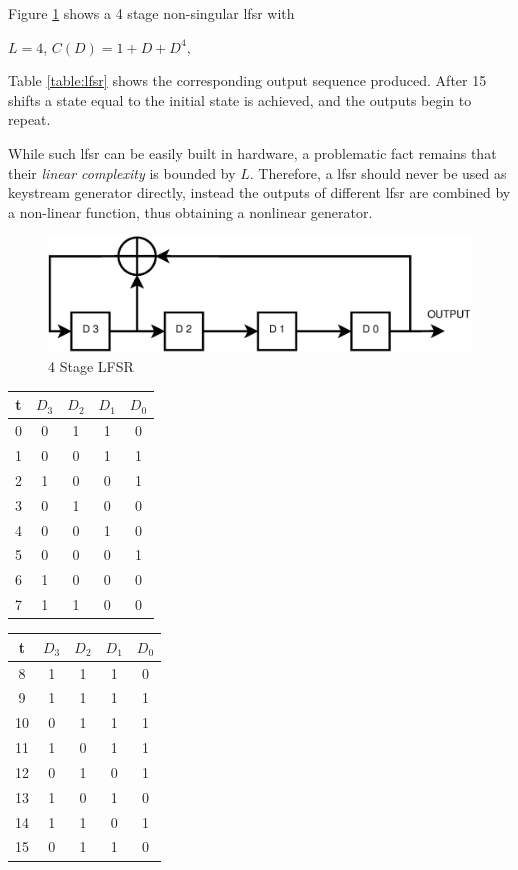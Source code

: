 Figure \ref{fig:lsfr} shows a 4 stage non-singular \gls{lfsr} with

\begin{center}
 $L=4$,  $C(D) = 1 + D + D^4$,
\end{center}

Table \ref{table:lfsr} \cite{handbookLFSR} shows the corresponding output sequence produced. After
15 shifts a state equal to the initial state is achieved, and the outputs
begin to repeat.

While such \gls{lfsr} can be easily built in hardware, a problematic fact remains that their \textit{linear complexity} is bounded by $L$. Therefore, a \gls{lfsr}
should never be used as keystream generator directly, instead the outputs of different \gls{lfsr} are combined by a non-linear function, thus obtaining a
nonlinear generator.

\begin{figure}
    \centering
    \includegraphics[width=1\textwidth]{figures/LSFR}
    \caption{4 Stage LFSR}
    \label{fig:lsfr}
\end{figure}

\begin{center}
\begin{minipage}{0.45\textwidth}
\begin{tabular}{ c | c | c | c | c }
 \label{table:lfsr}
  t & $D_3$ & $D_2$ & $D_1$ & $D_0$ \\ \hline
  0 & 0 & 1 & 1 & 0 \\
  1 & 0& 0& 1& 1\\
  2 & 1&0 &0 &1 \\
  3 & 0& 1& 0& 0\\
  4 & 0&0 &1 &0 \\
  5 & 0&0 &0 &1 \\
  6 & 1&0 &0 &0 \\
  7 & 1&1 &0 &0 \\
  \end{tabular}
\end{minipage}\hfill
\begin{minipage}{0.45\textwidth} 
\begin{tabular}{ c | c | c | c | c }
  t & $D_3$ & $D_2$ & $D_1$ & $D_0$ \\ \hline
  8  & 1& 1& 1& 0\\
  9  & 1& 1& 1& 1\\
  10 & 0& 1& 1& 1\\
  11 & 1& 0& 1& 1\\
  12 & 0& 1& 0& 1\\
  13 & 1& 0& 1& 0\\
  14 & 1& 1& 0& 1\\
  15 & 0& 1& 1& 0\\
\end{tabular}
\end{minipage}
\end{center}

